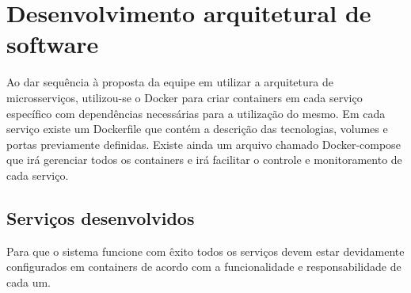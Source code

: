 \section{Desenvolvimento arquitetural de software}

Ao dar sequência à proposta da equipe em utilizar a arquitetura de microsserviços, utilizou-se o Docker para criar containers em cada serviço específico com dependências necessárias para a utilização do mesmo. Em cada serviço existe um Dockerfile que contém a descrição das tecnologias, volumes e portas previamente definidas. Existe ainda um arquivo chamado Docker-compose que irá gerenciar todos os containers e irá facilitar o controle e monitoramento de cada serviço.

\subsection{Serviços desenvolvidos}

Para que o sistema funcione com êxito todos os serviços devem estar devidamente configurados em containers de acordo com a funcionalidade e responsabilidade de cada um.

